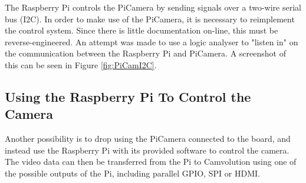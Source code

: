 The Raspberry Pi controls the PiCamera by sending signals over a two-wire serial bus (I2C).
In order to make use of the PiCamera, it is necessary to reimplement the control system.
Since there is little documentation on-line, this must be reverse-engineered.
An attempt was made to use a logic analyser to "listen in" on the communication between the Raspberry Pi and PiCamera.
A screenshot of this can be seen in Figure \ref{fig:PiCamI2C}.

\subsection{Using the Raspberry Pi To Control the Camera}
Another possibility is to drop using the PiCamera connected to the board,
and instead use the Raspberry Pi with its provided software to control the camera.
The video data can then be transferred from the Pi to Camvolution using one of the possible outputs of the Pi, including parallel GPIO, SPI or HDMI.

